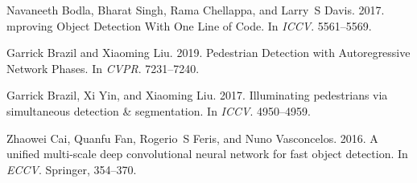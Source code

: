 \documentclass[sigconf]{acmart}
\begin{document}
\begin{thebibliography}{39}



\ifx \showCODEN    \undefined {}     \fi
\ifx \showDOI      \undefined \def \showDOI       #1{#1}\fi
\ifx \showISBNx    \undefined \def \showISBNx     #1{\unskip}     \fi
\ifx \showISBNxiii \undefined \def \showISBNxiii  #1{\unskip}     \fi
\ifx \showISSN     \undefined \def \showISSN      #1{\unskip}     \fi
\ifx \showLCCN     \undefined \def \showLCCN      #1{\unskip}     \fi
\ifx \shownote     \undefined \def \shownote      #1{#1}          \fi
\ifx \showarticletitle \undefined \def \showarticletitle #1{#1}   \fi
\ifx \showURL      \undefined \def \showURL       {\relax}        \fi
\providecommand\bibfield[2]{#2}
\providecommand\bibinfo[2]{#2}
\providecommand\natexlab[1]{#1}
\providecommand\showeprint[2][]{arXiv:#2}

\bibfield{author}{\bibinfo{person}{Navaneeth Bodla}, \bibinfo{person}{Bharat
  Singh}, \bibinfo{person}{Rama Chellappa}, {and} \bibinfo{person}{Larry~S
  Davis}.} \bibinfo{year}{2017}\natexlab{}.
\newblock \showarticletitle{{Soft-NMS--I}mproving Object Detection With One
  Line of Code}. In \bibinfo{booktitle}{\emph{ICCV}}.
  \bibinfo{pages}{5561--5569}.
\newblock


\bibfield{author}{\bibinfo{person}{Garrick Brazil} {and}
  \bibinfo{person}{Xiaoming Liu}.} \bibinfo{year}{2019}\natexlab{}.
\newblock \showarticletitle{Pedestrian Detection with Autoregressive Network
  Phases}. In \bibinfo{booktitle}{\emph{CVPR}}. \bibinfo{pages}{7231--7240}.
\newblock


\bibfield{author}{\bibinfo{person}{Garrick Brazil}, \bibinfo{person}{Xi Yin},
  {and} \bibinfo{person}{Xiaoming Liu}.} \bibinfo{year}{2017}\natexlab{}.
\newblock \showarticletitle{Illuminating pedestrians via simultaneous detection
  \& segmentation}. In \bibinfo{booktitle}{\emph{ICCV}}.
  \bibinfo{pages}{4950--4959}.
\newblock


\bibfield{author}{\bibinfo{person}{Zhaowei Cai}, \bibinfo{person}{Quanfu Fan},
  \bibinfo{person}{Rogerio~S Feris}, {and} \bibinfo{person}{Nuno Vasconcelos}.}
  \bibinfo{year}{2016}\natexlab{}.
\newblock \showarticletitle{A unified multi-scale deep convolutional neural
  network for fast object detection}. In \bibinfo{booktitle}{\emph{ECCV}}.
  Springer, \bibinfo{pages}{354--370}.
\newblock



\end{thebibliography}
\end{document}
